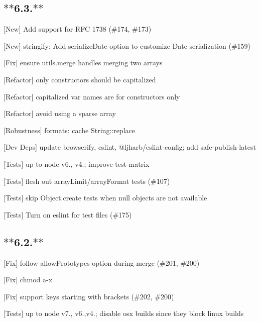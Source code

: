 \subsection*{$\ast$$\ast$6.3.$\ast$$\ast$}


\begin{DoxyItemize}
\item \mbox{[}New\mbox{]} Add support for R\+FC 1738 (\#174, \#173)
\item \mbox{[}New\mbox{]} {\ttfamily stringify}\+: Add {\ttfamily serialize\+Date} option to customize Date serialization (\#159)
\item \mbox{[}Fix\mbox{]} ensure {\ttfamily utils.\+merge} handles merging two arrays
\item \mbox{[}Refactor\mbox{]} only constructors should be capitalized
\item \mbox{[}Refactor\mbox{]} capitalized var names are for constructors only
\item \mbox{[}Refactor\mbox{]} avoid using a sparse array
\item \mbox{[}Robustness\mbox{]} {\ttfamily formats}\+: cache {\ttfamily String\+::replace}
\item \mbox{[}Dev Deps\mbox{]} update {\ttfamily browserify}, {\ttfamily eslint}, {\ttfamily @ljharb/eslint-\/config}; add {\ttfamily safe-\/publish-\/latest}
\item \mbox{[}Tests\mbox{]} up to {\ttfamily node} {\ttfamily v6.}, {\ttfamily v4.}; improve test matrix
\item \mbox{[}Tests\mbox{]} flesh out array\+Limit/array\+Format tests (\#107)
\item \mbox{[}Tests\mbox{]} skip Object.\+create tests when null objects are not available
\item \mbox{[}Tests\mbox{]} Turn on eslint for test files (\#175)
\end{DoxyItemize}

\subsection*{$\ast$$\ast$6.2.$\ast$$\ast$}


\begin{DoxyItemize}
\item \mbox{[}Fix\mbox{]} follow {\ttfamily allow\+Prototypes} option during merge (\#201, \#200)
\item \mbox{[}Fix\mbox{]} chmod a-\/x
\item \mbox{[}Fix\mbox{]} support keys starting with brackets (\#202, \#200)
\item \mbox{[}Tests\mbox{]} up to {\ttfamily node} {\ttfamily v7.}, {\ttfamily v6.},{\ttfamily v4.}; disable osx builds since they block linux builds
\end{DoxyItemize}

